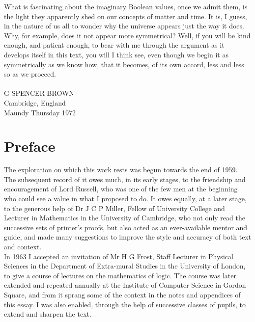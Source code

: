 \documentclass[a4paper]{article}
\theoremstyle{remark}
\begin{document}
What   is  fascinating   about   the  imaginary   Boolean   values,   once  we  admit  them,  is  the  light  they  apparently  shed  on  our  concepts  of  matter  and  time.  It  is,  I  guess,  in  the  nature  of  us  all  to  wonder  why  the  universe  appears  just  the  way  it  does.  Why,  for  example,  does  it not  appear  more  symmetrical?  Well, if  you  will  be  kind  enough,  and  patient  enough,  to  bear  with  me  through  the  argument  as  it  develops  itself  in  this  text,  you  will  I  think  see,  even  though  we  begin  it  as  symmetrically  as  we  know  how,  that  it becomes,  of  its own  accord,  less  and  less  so  as  we  proceed.\\
\\
G SPENCER-BROWN \\
Cambridge, England \\
Maundy Thursday 1972   


\newpage
\section*{Preface}

The  exploration  on  which  this  work  rests  was  begun  towards  the  end  of  1959. The  subsequent  record  of  it  owes  much,  in  its  early stages,  to   the   friendship   and   encouragement   of   Lord   Russell,  who  was  one  of  the  few  men  at  the  beginning  who  could  see  a  value  in  what  I  proposed  to  do.  It  owes  equally,  at  a  later  stage,  to  the  generous  help  of  Dr J C P Miller,  Fellow  of   University   College   and   Lecturer   in   Mathematics   in   the   University  of  Cambridge,  who  not  only  read  the  successive  sets  of  printer's  proofs,  but  also  acted  as  an  ever-available  mentor  and  guide,  and  made  many  suggestions  to  improve  the  style  and  accuracy  of  both  text  and  context.  \\

In 1963 I accepted an invitation of Mr H G Frost, Staff Lecturer in Physical Sciences in the Department of Extra-mural Studies in the University of London,  to give  a course  of  lectures  on  the mathematics  of logic. The  course  was later  extended  and  repeated   annually   at   the   Institute   of   Computer Science in Gordon Square, and  from  it  sprang  some  of  the  context  in  the  notes  and  appendices  of  this  essay.  I  was  also  enabled,  through  the  help  of  successive  classes  of  pupils,  to  extend  and  sharpen  the  text.\\
\end{document}
